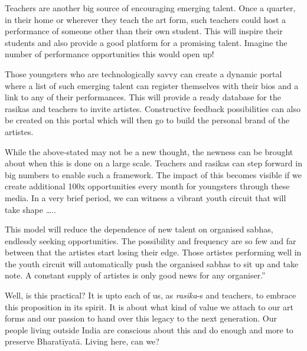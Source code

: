 \begin{itemize}
\begin{myquote}
Teachers are another big source of encouraging emerging talent. Once a quarter, in their home or wherever they teach the art form, such teachers could host a performance of someone other than their own student. This will inspire their students and also provide a good platform for a promising talent. Imagine the number of performance opportunities this would open up!
\end{myquote}

\begin{myquote}
Those youngsters who are technologically savvy can create a dynamic portal where a list of such emerging talent can register themselves with their bios and a link to any of their performances. This will provide a ready database for the rasikas and teachers to invite artistes. Constructive feedback possibilities can also be created on this portal which will then go to build the personal brand of the artistes.
\end{myquote}

\begin{myquote}
While the above-stated may not be a new thought, the newness can be brought about when this is done on a large scale. Teachers and rasikas can step forward in big numbers to enable such a framework. The impact of this becomes visible if we create additional 100x opportunities every month for youngsters through these media. In a very brief period, we can witness a vibrant youth circuit that will take shape …..
\end{myquote}

\begin{myquote}
This model will reduce the dependence of new talent on organised sabhas, endlessly seeking opportunities. The possibility and frequency are so few and far between that the artistes start losing their edge. Those artistes performing well in the youth circuit will automatically push the organised sabhas to sit up and take note. A constant supply of artistes is only good news for any organiser.”
\end{myquote}

 Well, is this practical? It is upto each of us, as \textit{rasika}-s and teachers, to embrace this proposition in its spirit. It is about what kind of value we attach to our art forms and our passion to hand over this legacy to the next generation. Our people living outside India are conscious about this and do enough and more to preserve Bharatīyatā. Living here, can we?


\end{itemize}
